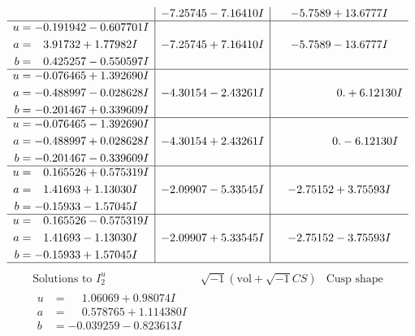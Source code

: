 \documentclass[1p]{elsarticle_modified}
\theoremstyle{definition}
\newcommand{\I}{\sqrt{-1}}
\begin{document}
$$\begin{array}{c|c|c}
 & -7.25745 - 7.16410 I & -5.7589 + 13.6777 I \\ \hline\begin{aligned}
u &= -0.191942 - 0.607701 I \\
a &= \phantom{-}3.91732 + 1.77982 I \\
b &= \phantom{-}0.425257 - 0.550597 I\end{aligned}
 & -7.25745 + 7.16410 I & -5.7589 - 13.6777 I \\ \hline\begin{aligned}
u &= -0.076465 + 1.392690 I \\
a &= -0.488997 - 0.028628 I \\
b &= -0.201467 + 0.339609 I\end{aligned}
 & -4.30154 - 2.43261 I & \phantom{-0.000000 -}0. + 6.12130 I \\ \hline\begin{aligned}
u &= -0.076465 - 1.392690 I \\
a &= -0.488997 + 0.028628 I \\
b &= -0.201467 - 0.339609 I\end{aligned}
 & -4.30154 + 2.43261 I & \phantom{-0.000000 } 0. - 6.12130 I \\ \hline\begin{aligned}
u &= \phantom{-}0.165526 + 0.575319 I \\
a &= \phantom{-}1.41693 + 1.13030 I \\
b &= -0.15933 - 1.57045 I\end{aligned}
 & -2.09907 - 5.33545 I & -2.75152 + 3.75593 I \\ \hline\begin{aligned}
u &= \phantom{-}0.165526 - 0.575319 I \\
a &= \phantom{-}1.41693 - 1.13030 I \\
b &= -0.15933 + 1.57045 I\end{aligned}
 & -2.09907 + 5.33545 I & -2.75152 - 3.75593 I\\
 \hline 
 \end{array}$$\newpage$$\begin{array}{c|c|c}  
\text{Solutions to }I^u_{2}& \I (\text{vol} + \sqrt{-1}CS) & \text{Cusp shape}\\
 \hline 
\begin{aligned}
u &= \phantom{-}1.06069 + 0.98074 I \\
a &= \phantom{-}0.578765 + 1.114380 I \\
b &= -0.039259 - 0.823613 I\end{aligned}

\end{array}$$
\end{document}
